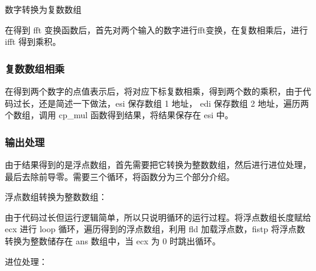 \documentclass[proposal-report]{bitart}
\begin{document}
\makeatletter
\def\BState{\State\hskip-\ALG@thistlm}
\makeatother
\begin{algorithm}[htb]
  \caption{数字转换为复数数组}
\end{algorithm}

在得到 fft 变换函数后，首先对两个输入的数字进行fft变换，在复数相乘后，进行 ifft 得到乘积。

\subsubsection{复数数组相乘}

在得到两个数字的点值表示后，将对应下标复数相乘，得到两个数的乘积，由于代码过长，还是简述一下做法，esi 保存数组 1 地址， edi 保存数组 2 地址，遍历两个数组，调用 cp\_mul 函数得到结果，将结果保存在 esi 中。

\subsubsection{输出处理}

由于结果得到的是浮点数组，首先需要把它转换为整数数组，然后进行进位处理，最后去除前导零。需要三个循环，将函数分为三个部分介绍。

浮点数组转换为整数数组：

由于代码过长但运行逻辑简单，所以只说明循环的运行过程。将浮点数组长度赋给 ecx 进行 loop 循环，遍历得到的浮点数组，利用 fld 加载浮点数，fistp 将浮点数转换为整数储存在 ans 数组中，当 ecx 为 0 时跳出循环。

进位处理：
\end{document}
